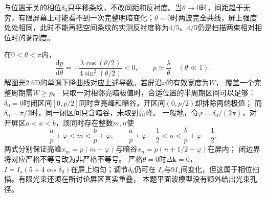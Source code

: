 \documentclass[UTF8,fontset=fandol,a4paper,11pt]{ctexart}
\begin{document}
与位置无关的相位$\delta_0$只平移条纹，不改间距和反衬度。当$\theta\to0$时，间距趋于无穷，有限屏幕上可能看不到一次完整明暗变化；$\theta=0$时两波完全共线，屏上强度处处相同，此时不能再把空间条纹的实测反衬度称为$4/5$。$4/5$仍是扫描两束相对相位时的调制度。

在$0<\theta<\pi$内，
\[
\frac{\mathrm dp}{\mathrm d\theta}
=-\frac{\lambda\cos(\theta/2)}{4\sin^2(\theta/2)}<0,
\qquad p\simeq\frac{\lambda}{\theta}\quad(\theta\ll1).
\]
解图光2.6D的单调下降曲线对应上述导数。若屏沿$x$的有效宽度为$W$，
覆盖一个完整周期需$W\geq p$。
只取一对相邻亮暗极值时，合适位置的半周期区间可以足够：
$\delta_0=0$时闭区间$[0,p/2]$同时含亮峰和暗谷，开区间$(0,p/2)$却排除两端极值；
而$\delta_0=\pi/2$时，同一闭区间只含暗谷，未取到亮峰。
一般地，令$\varphi=\delta_0/(2\pi)$，对开屏区$a<x<b$，须同时存在整数$m,n$使
\[
\frac ap+\varphi<m<\frac bp+\varphi,\qquad
\frac ap+\varphi-\frac12<n<\frac bp+\varphi-\frac12.
\]
两式分别保证亮峰$x_m=p(m-\varphi)$与暗谷$x_n=p(n+1/2-\varphi)$在屏内；
闭边界将对应严格不等号改为非严格不等号。
严格$\theta=0$时$\Delta\boldsymbol k=0$，
$I=I_s(5+4\cos\delta_0)$在屏上均匀；调节$\delta_0$仍可在
$I_s$与$9I_s$间变化，但这属于相位扫描。有限光束还须在所讨论屏区真实重叠，
本题平面波模型没有额外给出光束孔径。
\end{document}
